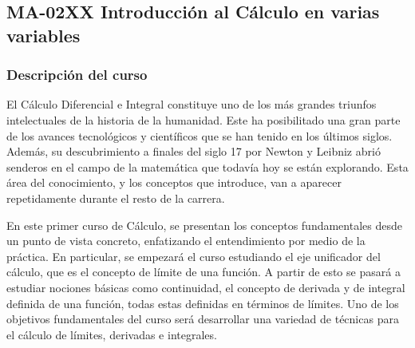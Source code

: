 
\newpage
\subsection*{MA-02XX Introducción al Cálculo en varias variables}

\begin{refsection}
\cite{axler2011algebra}

\begin{table}[H]
\end{table} 

\cite{lang1988basic}

\subsubsection*{Descripción del curso}

El Cálculo Diferencial e Integral constituye uno de los más grandes triunfos intelectuales de la historia de la humanidad. Este ha posibilitado una gran parte de los avances tecnológicos y científicos que se han tenido en los últimos siglos. Además, su descubrimiento a finales del siglo 17 por Newton y Leibniz  abrió senderos en el campo de la matemática que todavía hoy se están explorando.
Esta área del conocimiento, y los conceptos que introduce, van a aparecer repetidamente durante el resto de la carrera.

En este primer curso de Cálculo, se presentan los conceptos fundamentales desde un punto de vista concreto, enfatizando el entendimiento por medio de la práctica. En particular, se empezará el curso estudiando el eje unificador del cálculo, que es el concepto de límite de una función. A partir de esto se pasará a estudiar nociones básicas como continuidad, el concepto de derivada y de integral definida de una función, todas estas definidas en términos de límites. Uno de los objetivos fundamentales del curso será desarrollar una variedad de técnicas para el cálculo de límites, derivadas e integrales.


\end{refsection}
